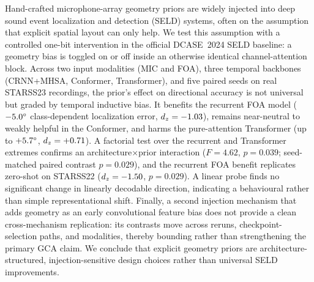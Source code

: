 Hand-crafted microphone-array geometry priors are widely injected into deep
sound event localization and detection (SELD) systems, often on the assumption
that explicit spatial layout can only help. We test this assumption with a
controlled one-bit intervention in the official DCASE~2024 SELD baseline: a
geometry bias is toggled on or off inside an otherwise identical
channel-attention block. Across two input modalities (MIC and FOA), three
temporal backbones (CRNN+MHSA, Conformer, Transformer), and five paired seeds
on real STARSS23 recordings, the prior's effect on directional accuracy is not
universal but graded by temporal inductive bias. It benefits the recurrent FOA
model ($-5.0^\circ$ class-dependent localization error, $d_z=-1.03$), remains
near-neutral to weakly helpful in the Conformer, and harms the pure-attention
Transformer (up to $+5.7^\circ$, $d_z=+0.71$). A factorial test over the
recurrent and Transformer extremes confirms an architecture$\times$prior
interaction ($F=4.62$, $p=0.039$; seed-matched paired contrast $p=0.029$), and
the recurrent FOA benefit replicates zero-shot on STARSS22 ($d_z=-1.50$,
$p=0.029$). A linear probe finds no significant change in linearly decodable
direction, indicating a behavioural rather than simple representational shift.
Finally, a second injection mechanism that adds geometry as an early
convolutional feature bias does not provide a clean cross-mechanism replication:
its contrasts move across reruns, checkpoint-selection paths, and modalities,
thereby bounding rather than strengthening the primary GCA claim. We conclude
that explicit geometry priors are architecture-structured, injection-sensitive
design choices rather than universal SELD improvements.
